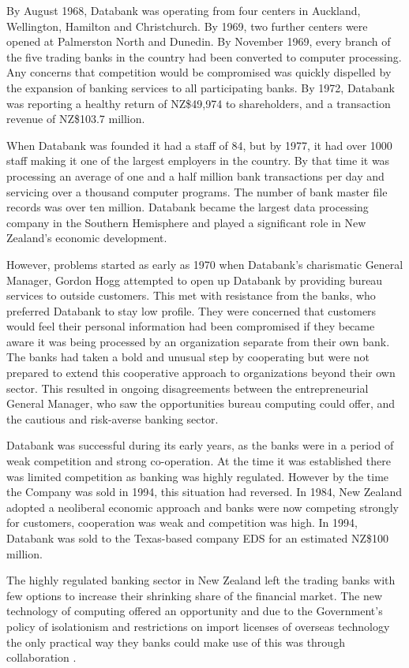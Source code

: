 \documentclass{IEEEcsmag}
\begin{document}
By August 1968, Databank was operating from four centers in Auckland, Wellington, Hamilton and Christchurch. By 1969, two further centers were opened at Palmerston North and Dunedin. By November 1969, every branch of the five trading banks in the country had been converted to computer processing. Any concerns that competition would be compromised was quickly dispelled by the expansion of banking services to all participating banks. By 1972, Databank was reporting a healthy return of NZ\$49,974 to shareholders, and a transaction revenue of  NZ\$103.7 million. 

When Databank was founded it had a staff of 84, but by 1977, it had over 1000 staff making it one of the largest employers in the country. By that time it was processing an average of one and a half million bank transactions per day and servicing over a thousand computer programs. The number of bank master file records was over ten million. Databank became the largest data processing company in the Southern Hemisphere and played a significant role in New Zealand’s economic development.

However, problems started as early as 1970 when Databank’s charismatic General Manager, Gordon Hogg attempted to open up Databank by providing bureau services to outside customers. This met with resistance from the banks, who preferred Databank to stay low profile. They were concerned that customers would feel their personal information had been compromised if they became aware it was being processed by an organization separate from their own bank. The banks had taken a bold and unusual step by cooperating but were not prepared to extend this cooperative approach to organizations beyond their own sector. This resulted in ongoing disagreements between the entrepreneurial General Manager, who saw the opportunities bureau computing could offer, and the cautious and risk-averse banking sector.

Databank was successful during its early years, as the banks were in a period of weak competition and strong co-operation. At the time it was established there was limited competition as banking was highly regulated. However by the time the Company was sold in 1994, this situation had reversed. In 1984, New Zealand adopted a neoliberal economic approach and banks were now competing strongly for customers, cooperation was weak and competition was high. In 1994, Databank was sold to the Texas-based company EDS for an estimated NZ\$100 million.

The highly regulated banking sector in New Zealand left the trading banks with few options to increase their shrinking share of the financial market. The new technology of computing offered an opportunity and due to the Government’s policy of isolationism and restrictions on import licenses of overseas technology the only practical way they banks could make use of this was through collaboration \cite{Toland-Databank, Archibald}.
\end{document}
